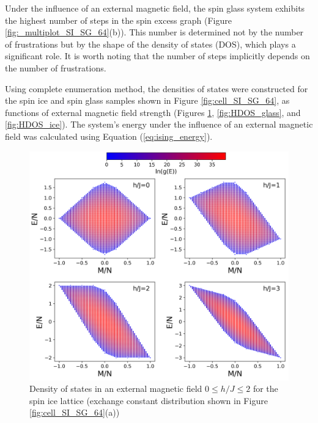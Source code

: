 \documentclass[utf8, babel, sor, jor, amsmath, amssymb, reprint]{elsarticle} %
\begin{document}
Under the influence of an external magnetic field, the spin glass system exhibits the highest number of steps in the spin excess graph (Figure \ref{fig:_multiplot_SI_SG_64}(b)).
This number is determined not by the number of frustrations but by the shape of the density of states (DOS), which plays a significant role.
It is worth noting that the number of steps implicitly depends on the number of frustrations.

Using complete enumeration method, the densities of states were constructed for the spin ice and spin glass samples shown in Figure \ref{fig:cell_SI_SG_64}, as functions of external magnetic field strength (Figures \ref{fig:HDOS_ice_1}, \ref{fig:HDOS_glass}, and \ref{fig:HDOS_ice}).
The system's energy under the influence of an external magnetic field was calculated using Equation (\ref{eq:ising_energy}).

\begin{figure}[H]
	\centering
	\includegraphics[width=1\linewidth]{pictures/HDOS_SI_64_J0_1.png}
	\caption{Density of states in an external magnetic field $0\leq h/J \leq 2$ for the spin ice lattice (exchange constant distribution shown in Figure \ref{fig:cell_SI_SG_64}(a))}
	\label{fig:HDOS_ice_1}
\end{figure}
\end{document}

